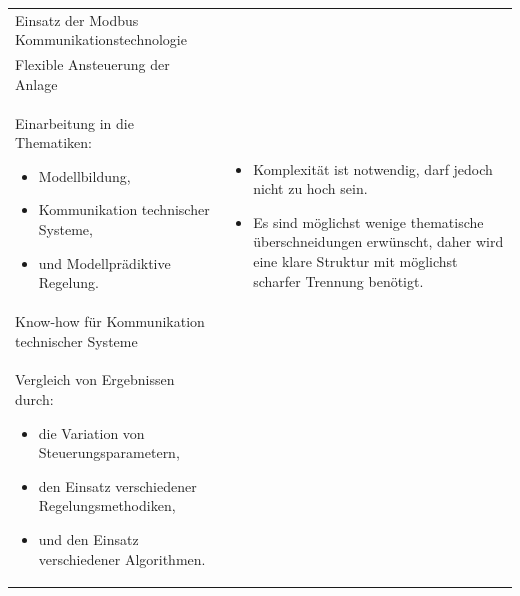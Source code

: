 \begin{table}[H]
\begin{tabularx}{1\textwidth}{m{}m{}}
\cmidrule[0.1pt](lr{2em}){1-1}
\addlinespace[4mm] Einsatz der Modbus \newline Kommunikationstechnologie \newline 	& 		\\

\cmidrule[0.1pt](lr{2em}){1-1}
\addlinespace[4mm] Flexible Ansteuerung der Anlage \newline & \\

\cmidrule[0.5pt](r{0.25em}){1-1} 
\cmidrule[0.5pt](l{0.25em}){2-2}

Einarbeitung in die Thematiken:
\begin{minipage}[t]{0.34\textwidth}
\begin{itemize}[itemsep=0pt,topsep=0pt,leftmargin=4mm]
	\item Modellbildung,
	\item Kommunikation technischer \newline Systeme,
	\item und Modellprädiktive \newline Regelung.
\end{itemize}
\end{minipage}
 	& \multirow{2}{\hsize}{
\begin{minipage}[t]{0.57\textwidth}
\begin{itemize}[itemsep=0pt,topsep=0pt,leftmargin=5mm]
	\item Komplexität ist notwendig, darf jedoch nicht zu hoch sein.
	\item Es sind möglichst wenige thematische überschneidungen erwünscht, daher wird eine klare Struktur mit möglichst scharfer Trennung benötigt.
\end{itemize}
\end{minipage}
}  \\

\cmidrule[0.1pt](lr{2em}){1-1} 

Know-how für Kommunikation \newline technischer Systeme 	&		\\

\cmidrule[0.5pt](r{0.25em}){1-1} 
\cmidrule[0.5pt](l{0.25em}){2-2}

Vergleich von Ergebnissen durch:
\begin{minipage}[t]{0.34\textwidth}
\begin{itemize}[itemsep=0pt,topsep=1pt,leftmargin=4mm]
	\item die Variation von \newline Steuerungsparametern,
	\item den Einsatz verschiedener \newline Regelungsmethodiken,
	\item und den Einsatz \newline verschiedener Algorithmen.
\end{itemize}
\end{minipage}


\end{tabularx}
\end{table}
